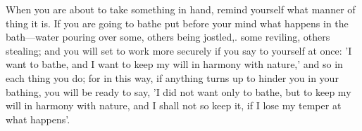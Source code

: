 When you are  about to take something  in hand, remind yourself  what manner of
thing it is. If you are going to bathe put before your mind what happens in the
bath—water pouring  over some, others  being jostled,. some  reviling, others
stealing; and  you will set  to work  more securely if  you say to  yourself at
once: 'I want to bathe, and I want to keep my will in harmony with nature,' and
so in each thing you do; for in this way, if anything turns up to hinder you in
your bathing, you will  be ready to say, 'I did not want  only to bathe, but to
keep my will in harmony  with nature, and I shall not so keep  it, if I lose my
temper at what happens'.
